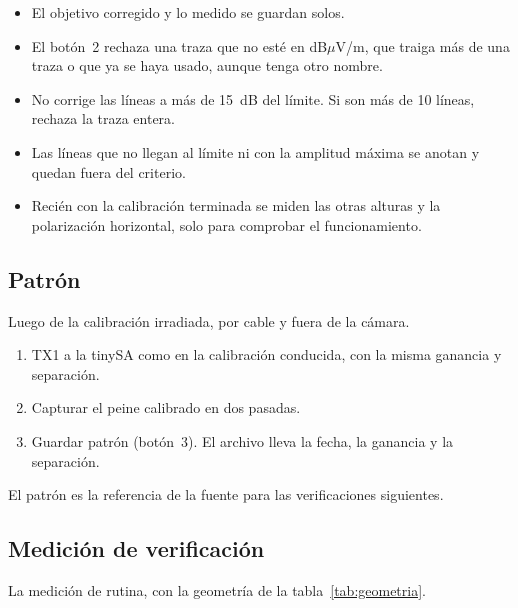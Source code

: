 \documentclass[11pt,a4paper]{article}
\begin{document}
\begin{itemize}
  \item El objetivo corregido y lo medido se guardan solos.
  \item El botón~2 rechaza una traza que no esté en dB$\mu$V/m, que traiga más de una traza o que ya se haya usado, aunque tenga otro nombre.
  \item No corrige las líneas a más de 15~dB del límite. Si son más de 10 líneas, rechaza la traza entera.
  \item Las líneas que no llegan al límite ni con la amplitud máxima se anotan y quedan fuera del criterio.
  \item Recién con la calibración terminada se miden las otras alturas y la polarización horizontal, solo para comprobar el funcionamiento.
\end{itemize}

\subsection{Patrón}\label{sec:perfil}

Luego de la calibración irradiada, por cable y fuera de la cámara.

\begin{enumerate}
  \item TX1 a la tinySA como en la calibración conducida, con la misma ganancia y separación.
  \item Capturar el peine calibrado en dos pasadas.
  \item Guardar patrón (botón~3). El archivo lleva la fecha, la ganancia y la separación.
\end{enumerate}

El patrón es la referencia de la fuente para las verificaciones siguientes.

\subsection{Medición de verificación}

La medición de rutina, con la geometría de la tabla~\ref{tab:geometria}.
\end{document}
